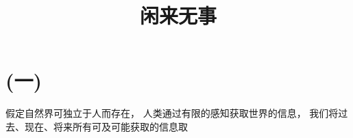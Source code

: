 \documentclass[fontset=windows, 12pt, a4paper]{article}
\date{}
\title{闲来无事}
\begin{document}
\maketitle

\section*{(一)}
假定自然界可独立于人而存在，
人类通过有限的感知获取世界的信息，
我们将过去、现在、将来所有可及可能获取的信息取


% 

\end{document}
